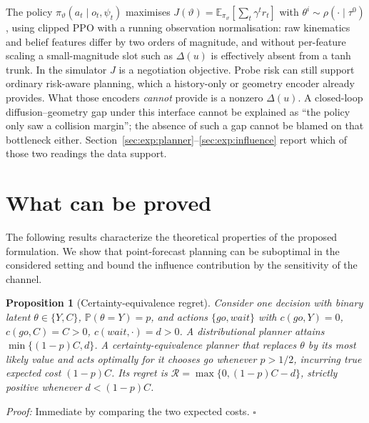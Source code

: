 \documentclass[conference]{IEEEtran}
\newcommand{\Expect}{\mathbb{E}}
\newcommand{\Prob}{\mathbb{P}}
\newtheorem{proposition}{Proposition}
\providecommand{\qed}{\hfill$\square$}
\newenvironment{proof}[1][Proof]{\par\noindent\textit{#1:} }{\qed\par}
\begin{document}
The policy $\pi_\vartheta(a_t \mid o_t, \psi_t)$ maximises
$J(\vartheta) = \Expect_{\pi_\vartheta}[\sum_t \gamma^t r_t]$ with
$\theta^i \sim \rho(\cdot \mid \tau^0)$, using clipped PPO
\cite{schulman2017proximal} with a running observation normalisation: raw
kinematics and belief features differ by two orders of magnitude, and without
per-feature scaling a small-magnitude slot such as $\Delta(u)$ is effectively
absent from a tanh trunk. In the simulator $J$ is a negotiation objective.
Probe risk can still support ordinary risk-aware planning, which a history-only
or geometry encoder already provides. What those encoders \emph{cannot} provide
is a nonzero $\Delta(u)$. A closed-loop diffusion--geometry gap under this
interface cannot be explained as ``the policy only saw a collision margin'';
the absence of such a gap cannot be blamed on that bottleneck either.
Section~\ref{sec:exp:planner}--\ref{sec:exp:influence} report which of those
two readings the data support.

\section{What can be proved}
\label{sec:theory}

The following results characterize the theoretical properties of the proposed formulation.
We show that point-forecast planning can be suboptimal in the considered setting and bound the influence contribution by the sensitivity of the channel.

\begin{proposition}[Certainty-equivalence regret]
\label{prop:ce}
Consider one decision with binary latent $\theta \in \{Y, C\}$, $\Prob(\theta =
Y) = p$, and actions $\{\textit{go}, \textit{wait}\}$ with $c(\textit{go}, Y) =
0$, $c(\textit{go}, C) = C > 0$, $c(\textit{wait}, \cdot) = d > 0$. A
distributional planner attains $\min\{(1-p)C, d\}$. A certainty-equivalence
planner that replaces $\theta$ by its most likely value and acts optimally for it
chooses \textit{go} whenever $p > 1/2$, incurring true expected cost $(1-p)C$.
Its regret is $\mathcal{R} = \max\{0, (1-p)C - d\}$, strictly positive whenever
$d < (1-p)C$.
\end{proposition}
\begin{proof}
Immediate by comparing the two expected costs.
\end{proof}
\end{document}
